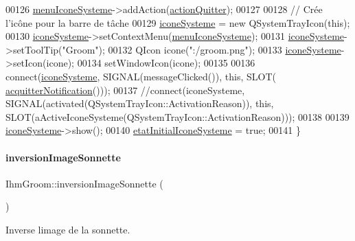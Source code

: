 \begin{DoxyCode}
00126     \hyperlink{class_ihm_groom_af2abf22a1a9203af547f32c7edb13710}{menuIconeSysteme}->addAction(\hyperlink{class_ihm_groom_ab28c091688d25e93b2baf99b4aa90f07}{actionQuitter});
00127 
00128     \textcolor{comment}{// Crée l'icône pour la barre de tâche}
00129     \hyperlink{class_ihm_groom_a9ca0929cf284a9a2e3e2bc3489249919}{iconeSysteme} = \textcolor{keyword}{new} QSystemTrayIcon(\textcolor{keyword}{this});
00130     \hyperlink{class_ihm_groom_a9ca0929cf284a9a2e3e2bc3489249919}{iconeSysteme}->setContextMenu(\hyperlink{class_ihm_groom_af2abf22a1a9203af547f32c7edb13710}{menuIconeSysteme});
00131     \hyperlink{class_ihm_groom_a9ca0929cf284a9a2e3e2bc3489249919}{iconeSysteme}->setToolTip(\textcolor{stringliteral}{"Groom"});
00132     QIcon icone(\textcolor{stringliteral}{":/groom.png"});
00133     \hyperlink{class_ihm_groom_a9ca0929cf284a9a2e3e2bc3489249919}{iconeSysteme}->setIcon(icone);
00134     setWindowIcon(icone);
00135 
00136     connect(\hyperlink{class_ihm_groom_a9ca0929cf284a9a2e3e2bc3489249919}{iconeSysteme}, SIGNAL(messageClicked()), \textcolor{keyword}{this}, SLOT(
      \hyperlink{class_ihm_groom_a428ffaecbab91abb0824ad61afd3109e}{acquitterNotification}()));
00137     \textcolor{comment}{//connect(iconeSysteme, SIGNAL(activated(QSystemTrayIcon::ActivationReason)), this,
       SLOT(aActiveIconeSysteme(QSystemTrayIcon::ActivationReason)));}
00138 
00139     \hyperlink{class_ihm_groom_a9ca0929cf284a9a2e3e2bc3489249919}{iconeSysteme}->show();
00140     \hyperlink{class_ihm_groom_a95d2d2b4b3b849c1b21f234844fca056}{etatInitialIconeSysteme} = \textcolor{keyword}{true};
00141 \}
\end{DoxyCode}
\mbox{\label{class_ihm_groom_a6a7d6102f1d90172215fd4f1aae6e166}} 
\paragraph{\texorpdfstring{inversion\+Image\+Sonnette}{inversionImageSonnette}}
{\footnotesize\ttfamily Ihm\+Groom\+::inversion\+Image\+Sonnette (\begin{DoxyParamCaption}{ }\end{DoxyParamCaption})\hspace{0.3cm}{\ttfamily [slot]}}



Inverse l\textquotesingle{}image de la sonnette. 



